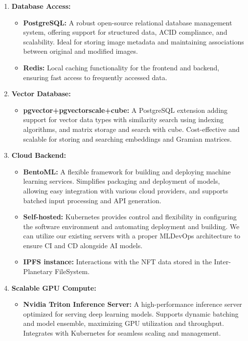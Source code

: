 \begin{enumerate}
\item \textbf{Database Access:}
    \begin{itemize}
        \item \textbf{PostgreSQL:} A robust open-source relational database management system, offering support for structured data, ACID compliance, and scalability. Ideal for storing image metadata and maintaining associations between original and modified images.
        \item \textbf{Redis:} Local caching functionality for the frontend and backend, ensuring fast access to frequently accessed data.
    \end{itemize}

\item \textbf{Vector Database:}
    \begin{itemize}
        \item \textbf{pgvector+pgvectorscale+cube:} A PostgreSQL extension adding support for vector data types with similarity search using indexing algorithms, and matrix storage and search with cube. Cost-effective and scalable for storing and searching embeddings and Gramian matrices.
    \end{itemize}

\item \textbf{Cloud Backend:}
    \begin{itemize}
        \item \textbf{BentoML:} A flexible framework for building and deploying machine learning services. Simplifies packaging and deployment of models, allowing easy integration with various cloud providers, and supports batched input processing and API generation.
        \item \textbf{Self-hosted:} Kubernetes provides control and flexibility in configuring the software environment and automating deployment and building. We can utilize our existing servers with a proper MLDevOps architecture to ensure CI and CD alongside AI models.
        \item \textbf{IPFS instance:} Interactions with the NFT data stored in the Inter-Planetary FileSystem.
    \end{itemize}

\item \textbf{Scalable GPU Compute:}
    \begin{itemize}
        \item \textbf{Nvidia Triton Inference Server:} A high-performance inference server optimized for serving deep learning models. Supports dynamic batching and model ensemble, maximizing GPU utilization and throughput. Integrates with Kubernetes for seamless scaling and management.
    \end{itemize}
\end{enumerate}

